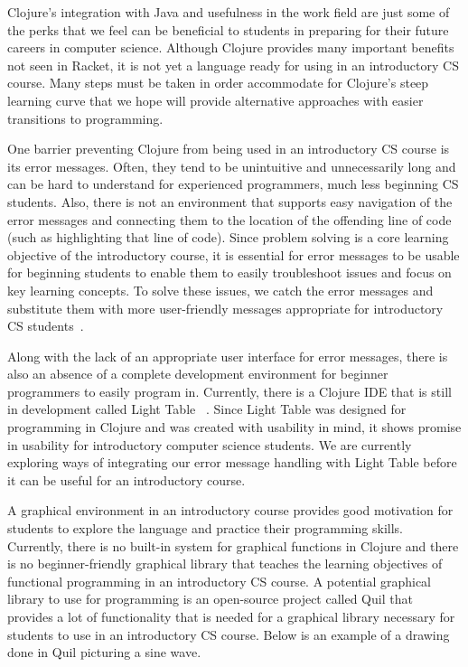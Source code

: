 \documentclass[12pt]{article}
\newcommand{\comment}[1]{{\bf \tt  {#1}}}
\newcommand{\emcomment}[1]{\textcolor{ForestGreen}{\comment{Elena: {#1}}}}
\newcommand{\pscomment}[1]{\textcolor{red}{\comment{Paul: {#1}}}}
\begin{document}
Clojure's integration with Java and usefulness in the work field are just some of the perks that we feel can be beneficial to students in preparing for their future careers in computer science.  Although Clojure provides many important benefits not seen in Racket, it is not yet a language ready for using in an introductory CS course. Many steps must be taken in order accommodate for Clojure's steep learning curve that we hope will provide alternative approaches with easier transitions to programming.

One barrier preventing Clojure from being used in an introductory CS course is its error messages. Often, they tend to be unintuitive and unnecessarily long and can be hard to understand for experienced programmers, much less beginning CS students. Also, there is not an environment that supports easy navigation of the error messages and connecting them to the location of the offending line of code (such as highlighting that line of code). Since problem solving is a core learning objective of the introductory course, it is essential for error messages to be usable for beginning students to enable them to easily troubleshoot issues and focus on key learning concepts. To solve these issues, we catch the error messages and substitute them with more user-friendly messages appropriate for introductory CS students~\cite{tfpie2014}.

Along with the lack of an appropriate user interface for error messages, there is also an absence of a complete development environment for beginner programmers to easily program in. %
Currently, there is a Clojure IDE that is still in development called Light Table ~\cite{lightTable}. Since Light Table was designed for programming in Clojure and was created with usability in mind, it shows promise in usability for introductory computer science students. We are currently exploring ways of integrating our error message handling with Light Table before it can be useful for an introductory course.

A graphical environment in an introductory course provides good motivation for students to explore the language and practice their programming skills. Currently, there is no built-in system for graphical functions in Clojure and there is no beginner-friendly graphical library that teaches the learning objectives of functional programming in an introductory CS course. A potential graphical library to use for programming is an open-source project called Quil that provides a lot of functionality that is needed for a graphical library necessary for students to use in an introductory CS course. Below is an example of a drawing done in Quil picturing a sine wave.
\end{document}
